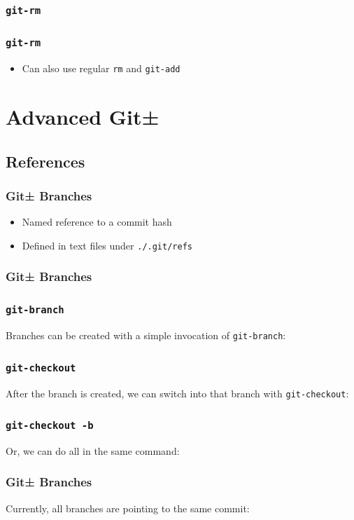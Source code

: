 \documentclass{beamer}
\begin{document}
\begin{frame}[fragile]
\frametitle{\texttt{git-rm}}

\end{frame}

\begin{frame}
\frametitle{\texttt{git-rm}}
\begin{itemize}
\item{Can also use regular \texttt{rm} and \texttt{git-add}}
\end{itemize}
\end{frame}

\section{Advanced Git±}
\subsection{References}
\begin{frame}
\frametitle{Git± Branches}
\begin{itemize}
\item<2->{Named reference to a commit hash}
\item<3->{Defined in text files under \texttt{./.git/refs}}
\end{itemize}
\end{frame}

\begin{frame}[fragile]
\frametitle{Git± Branches}

\end{frame}

\begin{frame}[fragile]
\frametitle{\texttt{git-branch}}
Branches can be created with a simple invocation of \texttt{git-branch}:

\end{frame}

\begin{frame}[fragile]
\frametitle{\texttt{git-checkout}}
After the branch is created, we can switch into that branch with
\texttt{git-checkout}:

\end{frame}

\begin{frame}[fragile]
\frametitle{\texttt{git-checkout -b}}
Or, we can do all in the same command:

\end{frame}

\begin{frame}[fragile]
\frametitle{Git± Branches}
Currently, all branches are pointing to the same commit:

\end{frame}
\end{document}
